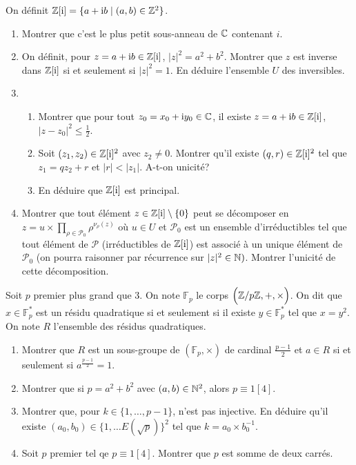 \begin{exercise}
	On définit $\mathbb{Z}[\mathrm{i}]=\{a+\mathrm{i}b\mid(a,b)\in\mathbb{Z}^{2}\}$.
	\begin{enumerate}
		\item
		Montrer que c'est le plus petit sous-anneau de $\mathbb{C}$ contenant $i$.
		\item
		On définit, pour $z=a+\mathrm{i}b\in\mathbb{Z}[\mathrm{i}]$, $\vert
		z\vert^{2}=a^{2}+b^{2}$. Montrer que $z$ est inverse dans $\mathbb{Z}[\mathrm{i}]$
		si et seulement si $\vert z\vert^{2}=1$. En déduire l'ensemble $U$ des
		inversibles.
		\item
		\begin{enumerate}
					\item
					Montrer que pour tout $z_{0}=x_{0}+\mathrm{i}y_{0}\in\mathbb{C}$, il
					existe $z=a+\mathrm{i}b\in\mathbb{Z}[\mathrm{i}]$, $\vert
					z-z_{0}\vert^{2}\leqslant\frac{1}{2}$.
					\item
					Soit $(z_{1},z_{2})\in\mathbb{Z}[\mathrm{i}]^{2}$ avec $z_{2}\neq 0$.
					Montrer qu'il existe $(q,r)\in\mathbb{Z}[\mathrm{i}]^{2}$ tel que
					$z_{1}=qz_{2}+r$ et $\vert r\vert<\vert z_{1}\vert$. A-t-on
					unicité?
					\item
					En déduire que $\mathbb{Z}[\mathrm{i}]$ est principal.
				\end{enumerate}
		\item
		Montrer que tout élément $z\in\mathbb{Z}[\mathrm{i}]\setminus\{0\}$ peut se
		décomposer en
		$z=u\times\prod_{\rho\in\mathcal{P}_{0}}\rho^{\nu_{\rho}(z)}$ où $u\in U$
		et $\mathcal{P}_{0}$ est un ensemble d'irréductibles tel que tout élément
		de $\mathcal{P}$ (irréductibles de $\mathbb{Z}[\mathrm{i}]$) est associé à un
		unique élément de $\mathcal{P}_{0}$ (on pourra raisonner par récurrence
		sur $\vert z\vert^{2}\in\mathbb{N})$. Montrer l'unicité de cette décomposition.
	\end{enumerate}
\end{exercise}

\begin{exercise}
	Soit $p$ premier plus grand que 3. On note $\mathbb{F}_{p}$ le corps
	$\Bigl(\mathbb{Z}/p\mathbb{Z},+,\times\Bigr)$. On dit que $x\in\mathbb{F}_{p}^{*}$ est un
	résidu quadratique si et seulement si il existe $y\in\mathbb{F}_{p}^{*}$ tel
	que $x=y^{2}$. On note $R$ l'ensemble des résidus quadratiques.
	\begin{enumerate}
		\item
		Montrer que $R$ est un sous-groupe de $(\mathbb{F}_{p},\times)$ de
		cardinal $\frac{p-1}{2}$ et $a\in R$ si et seulement si
		$a^{\frac{p-1}{2}}=1$.
		\item
		Montrer que si $p=a^{2}+b^{2}$ avec $(a,b)\in\mathbb{N}^{2}$, alors $p\equiv
		1[4]$.
		\item
		Montrer que, pour $k\in\{1,\dots,p-1\}$,  n'est pas injective. En
		déduire qu'il existe $(a_{0},b_{0})\in\{1,\dots E(\sqrt{p})\}^{2}$ tel que
		$k=a_{0}\times b_{0}^{-1}$.
		\item
		Soit $p$ premier tel qe $p\equiv 1[4]$. Montrer que $p$ est somme de deux
		carrés.
	\end{enumerate}
\end{exercise}

